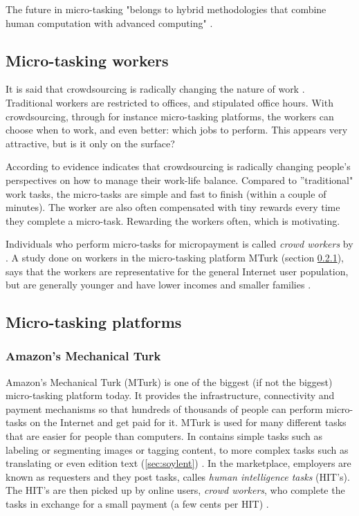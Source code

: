 The future in micro-tasking "belongs to hybrid methodologies that combine human computation with advanced computing" \citep{Meier2013}. 

\subsection{Micro-tasking workers}
It is said that crowdsourcing is radically changing the nature of work \citep{Deng2016a}. Traditional workers are restricted to offices, and stipulated office hours. With crowdsourcing, through for instance micro-tasking platforms, the workers can choose when to work, and even better: which jobs to perform. This appears very attractive, but is it only on the surface? 

According to \cite{Deng2016a} evidence indicates that crowdsourcing is radically changing people's perspectives on how to manage their work-life balance. Compared to ''traditional" work tasks, the micro-tasks are simple and fast to finish (within a couple of minutes). The worker are also often compensated with tiny rewards every time they complete a micro-task. 
Rewarding the workers often, which is motivating. 

Individuals who perform micro-tasks for micropayment is called \textit{crowd workers} by \citep{Deng2016a}. A study done on workers in the micro-tasking platform MTurk (section \ref{sec:mturk}), says that the workers are representative for the general Internet user population, but are generally younger and have lower incomes and smaller families \citep{Ipeirotis2010}.  

\subsection{Micro-tasking platforms}
\subsubsection[MTurk]{Amazon's Mechanical Turk}\label{sec:mturk}
Amazon's Mechanical Turk (MTurk) is one of the biggest (if not the biggest) micro-tasking platform today. It provides the infrastructure, connectivity and payment mechanisms so that hundreds of thousands of people can perform micro-tasks on the Internet and get paid for it. MTurk is used for many different tasks that are easier for people than computers. In contains simple tasks such as labeling or segmenting images or tagging content, to more complex tasks such as translating or even edition text (\ref{sec:soylent}) \citep{Franklin2011}.  In the marketplace, employers are known as requesters and they post tasks, calles \textit{human intelligence tasks} (HIT's). The HIT's are then picked up by online users, \textit{crowd workers}, who complete the tasks in exchange for a small payment (a few cents per HIT) \citep{Ipeirotis2010}. 

